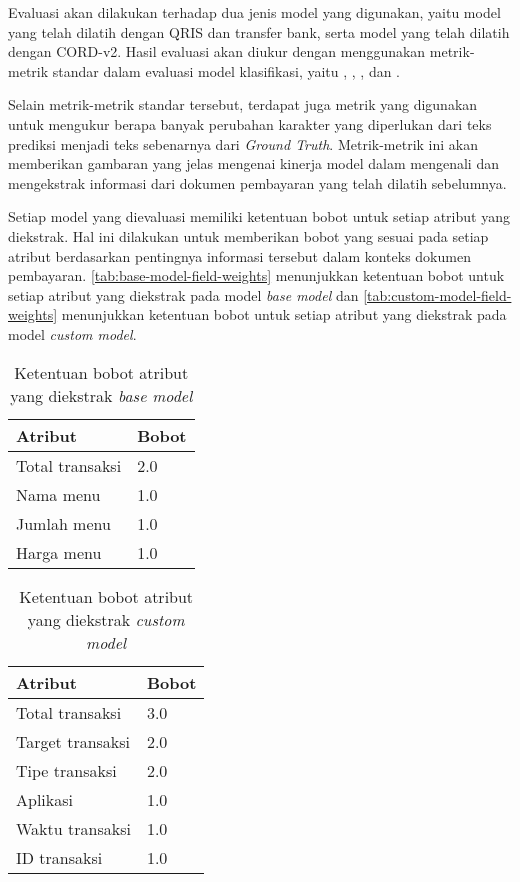 Evaluasi akan dilakukan terhadap dua jenis model yang digunakan, yaitu model \donut{} yang telah dilatih dengan \dataset{} QRIS dan transfer bank, serta model \donut{} yang telah dilatih dengan \dataset{} CORD-v2. Hasil evaluasi akan diukur dengan menggunakan metrik-metrik standar dalam evaluasi model klasifikasi, yaitu \accuracy, \precision, \recall, dan \fscore. 

Selain metrik-metrik standar tersebut, terdapat juga metrik \mcer{} yang digunakan untuk mengukur berapa banyak perubahan karakter yang diperlukan dari teks prediksi menjadi teks sebenarnya dari \emph{Ground Truth}. Metrik-metrik ini akan memberikan gambaran yang jelas mengenai kinerja model dalam mengenali dan mengekstrak informasi dari dokumen pembayaran yang telah dilatih sebelumnya.

Setiap model yang dievaluasi memiliki ketentuan bobot untuk setiap atribut yang diekstrak. Hal ini dilakukan untuk memberikan bobot yang sesuai pada setiap atribut berdasarkan pentingnya informasi tersebut dalam konteks dokumen pembayaran. \autoref{tab:base-model-field-weights} menunjukkan ketentuan bobot untuk setiap atribut yang diekstrak pada model \emph{base model} dan \autoref{tab:custom-model-field-weights} menunjukkan ketentuan bobot untuk setiap atribut yang diekstrak pada model \emph{custom model}.

\begin{table}[h!]
    \centering
    \caption{Ketentuan bobot atribut yang diekstrak \emph{base model}}
    \label{tab:base-model-field-weights}
    \begin{tabularx}{\textwidth}{|X|X|}
        \hline
        \textbf{Atribut} & \textbf{Bobot} \\ \hline
        Total transaksi & 2.0 \\ \hline
        Nama menu & 1.0 \\ \hline
        Jumlah menu & 1.0 \\ \hline
        Harga menu & 1.0 \\ \hline 
    \end{tabularx}
\end{table}

\begin{table}[h!]
    \centering
    \caption{Ketentuan bobot atribut yang diekstrak \emph{custom model}}
    \label{tab:custom-model-field-weights}
    \begin{tabularx}{\textwidth}{|X|X|}
        \hline
        \textbf{Atribut} & \textbf{Bobot} \\ \hline
        Total transaksi & 3.0 \\ \hline
        Target transaksi & 2.0 \\ \hline
        Tipe transaksi & 2.0 \\ \hline
        Aplikasi & 1.0 \\ \hline
        Waktu transaksi & 1.0 \\ \hline
        ID transaksi & 1.0 \\ \hline
    \end{tabularx}
\end{table}
